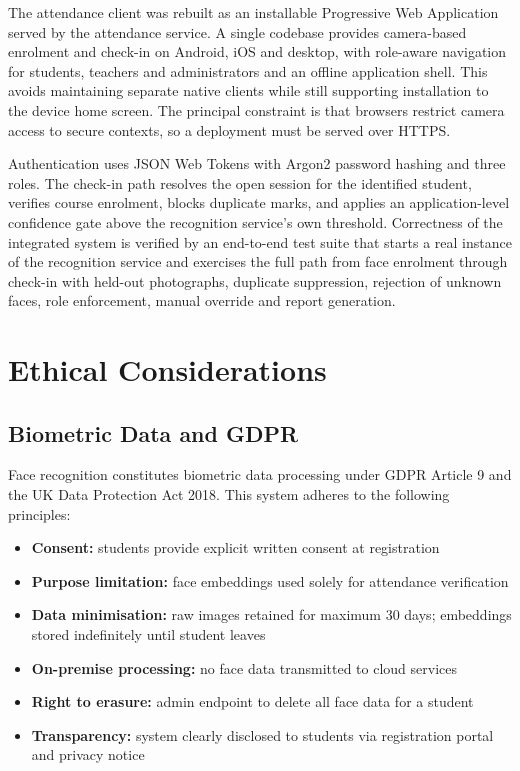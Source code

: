 \documentclass[12pt,a4paper]{report}
\begin{document}
The attendance client was rebuilt as an installable Progressive Web Application
served by the attendance service. A single codebase provides camera-based
enrolment and check-in on Android, iOS and desktop, with role-aware navigation for
students, teachers and administrators and an offline application shell. This
avoids maintaining separate native clients while still supporting installation to
the device home screen. The principal constraint is that browsers restrict camera
access to secure contexts, so a deployment must be served over HTTPS.

Authentication uses JSON Web Tokens with Argon2 password hashing and three roles.
The check-in path resolves the open session for the identified student, verifies
course enrolment, blocks duplicate marks, and applies an application-level
confidence gate above the recognition service's own threshold. Correctness of the
integrated system is verified by an end-to-end test suite that starts a real
instance of the recognition service and exercises the full path from face
enrolment through check-in with held-out photographs, duplicate suppression,
rejection of unknown faces, role enforcement, manual override and report
generation.

\chapter{Ethical Considerations}
\label{chap:ethics}

\section{Biometric Data and GDPR}
Face recognition constitutes biometric data processing under GDPR Article 9 and the UK Data Protection Act 2018. This system adheres to the following principles:

\begin{itemize}
  \item \textbf{Consent:} students provide explicit written consent at registration
  \item \textbf{Purpose limitation:} face embeddings used solely for attendance verification
  \item \textbf{Data minimisation:} raw images retained for maximum 30 days; embeddings stored indefinitely until student leaves
  \item \textbf{On-premise processing:} no face data transmitted to cloud services
  \item \textbf{Right to erasure:} admin endpoint to delete all face data for a student
  \item \textbf{Transparency:} system clearly disclosed to students via registration portal and privacy notice
\end{itemize}
\end{document}
